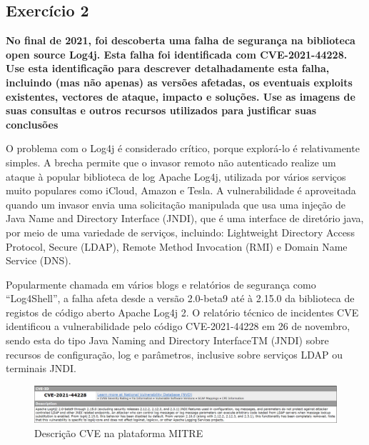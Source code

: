 \documentclass[11t]{article}
\begin{document}
\clearpage
\subsection{Exercício 2}
\textbf{No final de 2021, foi descoberta uma falha de segurança na biblioteca open source Log4j. Esta falha foi identificada com CVE-2021-44228. Use esta identificação para descrever detalhadamente esta falha, incluindo (mas não apenas) as versões afetadas, os eventuais exploits existentes, vectores de ataque, impacto e soluções. Use as imagens de suas consultas e outros recursos utilizados para justificar suas conclusões}

\vspace{0.5cm}

O problema com o Log4j é considerado crítico, porque explorá-lo é relativamente simples. A brecha permite que o invasor remoto não autenticado realize um ataque à popular biblioteca de log Apache Log4j, utilizada por vários serviços muito populares como iCloud, Amazon e Tesla. A vulnerabilidade é aproveitada quando um invasor envia uma solicitação manipulada que usa uma injeção de Java Name and Directory Interface (JNDI), que é uma interface de diretório java, por meio de uma variedade de serviços, incluindo: Lightweight Directory Access Protocol, Secure (LDAP), Remote Method Invocation (RMI) e Domain Name Service (DNS).

\vspace{0.1cm}

Popularmente chamada em vários blogs e relatórios de segurança como “Log4Shell”, a falha afeta desde a versão 2.0-beta9 até à 2.15.0 da biblioteca de registos de código aberto Apache Log4j 2. O relatório técnico de incidentes CVE identificou a vulnerabilidade pelo código CVE-2021-44228 em 26 de novembro, sendo esta do tipo Java Naming and Directory InterfaceTM (JNDI) sobre recursos de configuração, log e parâmetros, inclusive sobre serviços LDAP ou terminais JNDI.

\vspace{0.2cm}

\begin{figure}[H]
    \centering
    \includegraphics[width=1\textwidth]{images/descricaoPergunta2.png}
    \caption{Descrição CVE na plataforma MITRE}
\end{figure}
\end{document}
